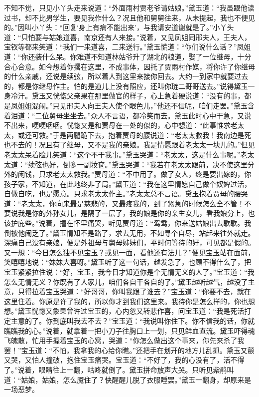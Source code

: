 \begin{parag}
    不知不觉，只见小丫头走来说道：“外面雨村贾老爷请姑娘。”黛玉道：“我虽跟他读过书，却不比男学生，要见我作什么？况且他和舅舅往来，从未提起，我也不便见的。”因叫小丫头：“回复‘身上有病不能出来’，与我请安道谢就是了。”小丫头道：“只怕要与姑娘道喜，南京还有人来接。”说着，又见凤姐同邢夫人，王夫人，宝钗等都来笑道：“我们一来道喜，二来送行。”黛玉慌道：“你们说什么话？”凤姐道：“你还装什么呆。你难道不知道林姑爷升了湖北的粮道，娶了一位继母，十分合心合意。如今想着你撂在这里，不成事体，因托了贾雨村作媒，将你许了你继母的什么亲戚，还说是续弦，所以着人到这里来接你回去。大约一到家中就要过去的，都是你继母作主。怕的是道儿上没有照应，还叫你琏二哥哥送去。”说得黛玉一身冷汗。黛玉又恍惚父亲果在那里做官的样子，心上急着硬说道：“没有的事，都是凤姐姐混闹。”只见邢夫人向王夫人使个眼色儿，”他还不信呢，咱们走罢。”黛玉含着泪道：“二位舅母坐坐去。”众人不言语，都冷笑而去。黛玉此时心中干急，又说不出来，哽哽咽咽。恍惚又是和贾母在一处的似的，心中想道：“此事惟求老太太，或还可救。”于是两腿跪下去，抱着贾母的腰说道：“老太太救我！我南边是死也不去的！况且有了继母，又不是我的亲娘。我是情愿跟着老太太一块儿的。”但见老太太呆着脸儿笑道：“这个不干我事。”黛玉哭道：“老太太，这是什么事呢。”老太太道：“续弦也好，倒多一副妆奁。”黛玉哭道：“我若在老太太跟前，决不使这里分外的闲钱，只求老太太救我。”贾母道：“不中用了。做了女人，终是要出嫁的，你孩子家，不知道，在此地终非了局。”黛玉道：“我在这里情愿自己做个奴婢过活，自做自吃，也是愿意。只求老太太作主。”老太太总不言语。黛玉抱着贾母的腰哭道：“老太太，你向来最是慈悲的，又最疼我的，到了紧急的时候怎么全不管！不要说我是你的外孙女儿，是隔了一层了，我的娘是你的亲生女儿，看我娘分上，也该护庇些。”说着，撞在怀里痛哭，听见贾母道：“鸳鸯，你来送姑娘出去歇歇。我倒被他闹乏了。”黛玉情知不是路了，求去无用，不如寻个自尽，站起来往外就走。深痛自己没有亲娘，便是外祖母与舅母姊妹们，平时何等待的好，可见都是假的。又一想：“今日怎么独不见宝玉？或见一面，看他还有法儿？”便见宝玉站在面前，笑嘻嘻地说：“妹妹大喜呀。”黛玉听了这一句话，越发急了，也顾不得什么了，把宝玉紧紧拉住说：“好，宝玉，我今日才知道你是个无情无义的人了。”宝玉道：“我怎么无情无义？你既有了人家儿，咱们各自干各自的了。”黛玉越听越气，越没了主意，只得拉着宝玉哭道：“好哥哥，你叫我跟了谁去？”宝玉道：“你要不去，就在这里住着。你原是许了我的，所以你才到我们这里来。我待你是怎么样的，你也想想。”黛玉恍惚又象果曾许过宝玉的，心内忽又转悲作喜，问宝玉道：“我是死活打定主意的了。你到底叫我去不去？”宝玉道：“我说叫你住下。你不信我的话，你就瞧瞧我的心。”说着，就拿着一把小刀子往胸口上一划，只见鲜血直流。黛玉吓得魂飞魄散，忙用手握着宝玉的心窝，哭道：“你怎么做出这个事来，你先来杀了我罢！”宝玉道：“不怕，我拿我的心给你瞧。”还把手在划开的地方儿乱抓。黛玉又颤又哭，又怕人撞破，抱住宝玉痛哭。宝玉道：“不好了，我的心没有了，活不得了。”说着，眼睛往上一翻，咕咚就倒了。黛玉拼命放声大哭。只听见紫鹃叫道：“姑娘，姑娘，怎么魇住了？快醒醒儿脱了衣服睡罢。”黛玉一翻身，却原来是一场恶梦。
\end{parag}


